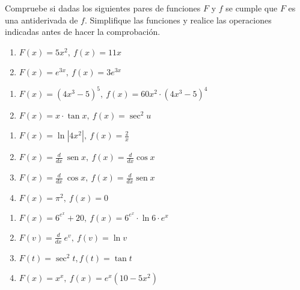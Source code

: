 \documentclass[11pt,letterpaper,oneside]{book}
\numberwithin{equation}{section}
\newcommand{\der}[1][x]{\frac{d}{d#1} }
\begin{document}
	\par
	Compruebe si dadas los siguientes pares de funciones $F$ y $f$ se cumple que $F$ es una antiderivada de $f$. Simplifique las funciones  y realice las operaciones indicadas antes de hacer la comprobación.
	
	\par
	\begin{minipage}[t]{0.48\linewidth}
		\begin{enumerate}[series=Ej1]
			\item $F(x)=5x^2, \ f(x)=11x $ 
			\item $F(x)=e^{3x}, \ f(x)= 3e^{3x}$
		\end{enumerate}
	\end{minipage}
	\begin{minipage}[t]{0.48\linewidth}
		\begin{enumerate}[resume*=Ej1]
			\item $F(x)=(4x^3-5)^5 ,\ f(x)=60x^2\cdot (4x^3-5)^4$
			\item $F(x)=x\cdot \operatorname{tan} x, \ f(x)=\operatorname{sec}^2 u $
		\end{enumerate}
	\end{minipage}
	
	\begin{minipage}[t]{0.48\linewidth}
		\begin{enumerate}[resume*=Ej1]
			\item $F(x)=\operatorname{ln} |4x^2|, \ f(x)=\tfrac{2}{x}$
			\item $F(x)=\der \ \operatorname{sen} x, \ f(x)= \der \operatorname{cos} x $
			\item $F(x)=\der \ \operatorname{cos} x, \ f(x)= \der \operatorname{sen} x $
			\item $F(x)=\pi^2, \ f(x)= 0 $
		\end{enumerate}
	\end{minipage}
	\begin{minipage}[t]{0.48\linewidth}
		\begin{enumerate}[resume*=Ej1]
			\item $F(x)= 6^{e^x} + 20, \ f(x)=6^{e^x} \cdot \operatorname{ln} 6 \cdot e^x $
			\item$F(v)= \der \ e^v, \ f(v)= \operatorname{ln} v$
			\item $F(t)= \operatorname{sec}^2 t, f(t)=\operatorname{tan} t $
			\item $F(x)=x^x, \ f(x)= e^x(10-5x^2)$
		\end{enumerate}
	\end{minipage}
\end{document}
